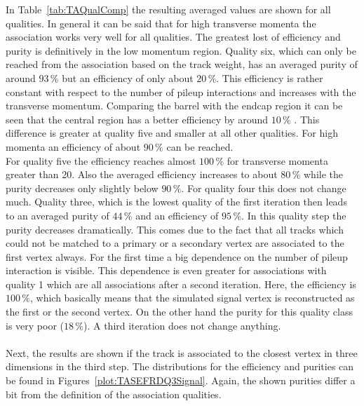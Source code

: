 In Table~\ref{tab:TAQualComp} the resulting averaged values are shown for all qualities. In general it can be said that for high transverse momenta the association works very well for all qualities. The greatest lost of efficiency and purity is definitively in the low momentum region. Quality six, which can only be reached from the association based on the track weight, has an averaged purity of around $93\,\%$ but an efficiency of only about $20\,\%$. This efficiency is rather constant with respect to the number of pileup interactions and increases with the transverse momentum. Comparing the barrel with the endcap region it can be seen that the central region has a better efficiency by around $10\,\%$ . This difference is greater at quality five and smaller at all other qualities. For high momenta an efficiency of about $90\,\%$ can be reached. \\
For quality five the efficiency reaches almost $100\,\%$ for transverse momenta greater than 20\GeV. Also the averaged efficiency increases to about $80\,\%$  while the purity decreases only slightly below $90\,\%$. For quality four this does not change much. Quality three, which is the lowest quality of the first iteration then leads to an averaged purity of $44\,\%$ and an efficiency of $95\,\%$. In this quality step the purity decreases dramatically. This comes due to the fact that all tracks which could not be matched to a primary or a secondary vertex are associated to the first vertex always. For the first time a big dependence on the number of pileup interaction is visible. This dependence is even greater for associations with quality 1 which are all associations after a second iteration. Here, the efficiency is $100\,\%$, which basically means that the simulated signal vertex is reconstructed as the first or the second vertex. On the other hand the purity for this quality class is very poor ($18\,\%$). A third iteration does not change anything. \\ \\
Next, the results are shown if the track is associated to the closest vertex in three dimensions in the third step. The distributions for the efficiency and purities can be found in Figures~\ref{plot:TASEFRDQ3Signal}. Again, the shown purities differ a bit from the definition of the association qualities.

